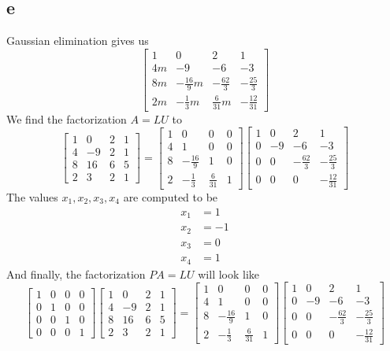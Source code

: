 \documentclass[12pt]{article}
\begin{document}
\subsection*{e}
Gaussian elimination gives us
$$
\begin{bmatrix}
1 & 0 & 2 & 1\\
4m & -9 & -6 & -3 \\
8m & -\frac{16}{9}m & -\frac{62}{3} & -\frac{25}{3} \\
2m & -\frac{1}{3}m & \frac{6}{31}m & -\frac{12}{31}
\end{bmatrix}
$$
We find the factorization $A=LU$ to
$$
\begin{bmatrix}
1 & 0 & 2 & 1\\
4 & -9 & 2 & 1 \\
8 & 16 & 6 & 5 \\
2 & 3 & 2 & 1
\end{bmatrix}
=
\begin{bmatrix}
1 & 0 & 0 & 0\\
4 & 1 & 0 & 0 \\
8 & -\frac{16}{9} & 1 & 0 \\
2 & -\frac{1}{3} & \frac{6}{31} & 1
\end{bmatrix}
\begin{bmatrix}
1 & 0 & 2 & 1\\
0 & -9 & -6 & -3 \\
0 & 0 & -\frac{62}{3} & -\frac{25}{3} \\
0 & 0 & 0 & -\frac{12}{31}
\end{bmatrix}
$$
The values $x_1,x_2,x_3,x_4$ are computed to be
\begin{align*}
x_1&=1 \\
x_2&=-1 \\
x_3&=0 \\
x_4&=1
\end{align*}
And finally, the factorization $PA=LU$ will look like
$$
\begin{bmatrix}
1 & 0 & 0 & 0\\
0 & 1 & 0 & 0 \\
0 & 0 & 1 & 0 \\
0 & 0 & 0 & 1
\end{bmatrix}
\begin{bmatrix}
1 & 0 & 2 & 1\\
4 & -9 & 2 & 1 \\
8 & 16 & 6 & 5 \\
2 & 3 & 2 & 1
\end{bmatrix}
=
\begin{bmatrix}
1 & 0 & 0 & 0\\
4 & 1 & 0 & 0 \\
8 & -\frac{16}{9} & 1 & 0 \\
2 & -\frac{1}{3} & \frac{6}{31} & 1
\end{bmatrix}
\begin{bmatrix}
1 & 0 & 2 & 1\\
0 & -9 & -6 & -3 \\
0 & 0 & -\frac{62}{3} & -\frac{25}{3} \\
0 & 0 & 0 & -\frac{12}{31}
\end{bmatrix}
$$
\end{document}
